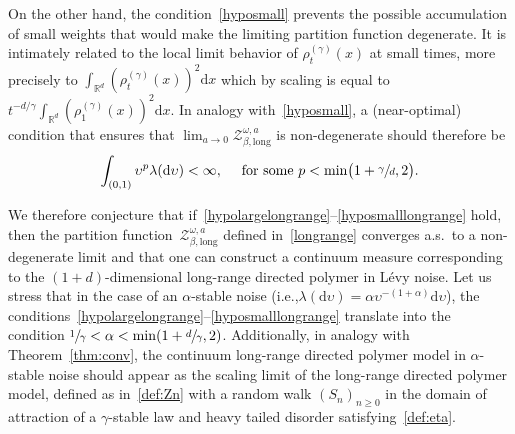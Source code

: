 \documentclass[11pt]{article}
\newcommand{\ie}{i.e.,\xspace}
\numberwithin{equation}{section}
\let\mathcal\mathscr
\theoremstyle{definition}
\newcommand{\dd}{\mathrm{d}}
\newcommand{\cZ}{{\ensuremath{\mathcal Z}} }
\newcommand{\bbR}{{\ensuremath{\mathbb R}} }
\let\ga\alpha
\let\gb\beta
\let\ups\upsilon
\let\go\omega
\begin{document}
On the other hand, the condition~\eqref{hyposmall}
prevents the possible accumulation of small weights that would make the limiting partition function degenerate.
It is intimately related to the local limit behavior of $\rho_t^{(\gamma)}(x)$ at small times, more precisely to
$\int_{\bbR^d} (\rho_t^{(\gamma)}(x))^2 \dd x$ which by scaling is equal to $t^{-d/\gamma} \int_{\bbR^d} (\rho_1^{(\gamma)}(x))^2 \dd x.$
In analogy with~\eqref{hyposmall}, a (near-optimal) condition that ensures that $ \lim_{a\to 0}\cZ_{\gb, \mathrm{long}}^{\go,a}$ is non-degenerate should therefore be
\begin{equation}
\label{hyposmalllongrange}
\int_{(0,1)} \ups^{p} \lambda(\dd \ups) <\infty,\quad \text{ for some } p< \min \bigl(1+\sfrac{\gamma}{d}, 2 \bigr).
\end{equation}

We therefore conjecture that if~\eqref{hypolargelongrange}--\eqref{hyposmalllongrange} hold,
then the partition function~$\cZ_{\gb,\mathrm{long}}^{\go,a}$ defined in~\eqref{longrange} converges a.s.\ to a non-degenerate limit and that one can construct a continuum measure corresponding to the $(1+d)$-dimensional long-range directed polymer in Lévy noise.
Let us stress that in the case of an $\ga$-stable noise (\ie $\lambda(\dd \ups) = \ga \ups^{-(1+\ga)} \dd \ups$),
the conditions~\eqref{hypolargelongrange}--\eqref{hyposmalllongrange} translate into the condition $\sfrac1\gamma < \ga < \min(1+\sfrac{d}{\gamma}, 2)$.
Additionally, in analogy with Theorem~\ref{thm:conv}, the continuum long-range directed polymer model in $\ga$-stable noise should appear
as the scaling limit of the long-range
directed polymer model, defined as in~\eqref{def:Zn}
with a random walk $(S_n)_{n\geq 0}$
in the domain of attraction of a $\gamma$-stable law
and heavy tailed disorder satisfying~\eqref{def:eta}.
\end{document}
